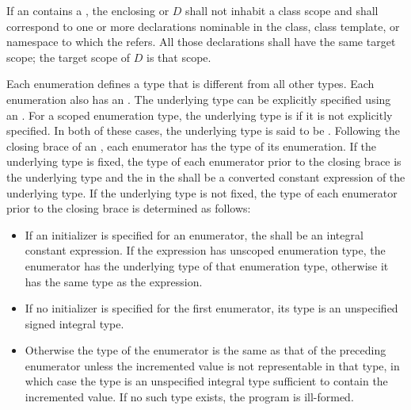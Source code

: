 \pnum
If an  contains a
,
the enclosing 
or  $D$
shall not inhabit a class scope and
shall correspond to one or more declarations nominable
in the class, class template, or namespace
to which the  refers.
All those declarations shall have the same target scope;
the target scope of $D$ is that scope.

\pnum
{}%
%
Each enumeration defines a type that is different from all other types.
Each enumeration also has an .
The underlying type can be explicitly specified using an .
For a scoped enumeration type, the underlying type is  if it is not
explicitly specified. In both of these cases, the underlying type is said to be
.
Following the closing brace of an , each
enumerator has the type of its enumeration.
If the underlying type is fixed, the type of each enumerator
prior to the closing brace is the underlying
type
and the  in the 
shall be a converted constant expression of the underlying
type.
If the underlying
type is not fixed,
the type of each enumerator prior to the closing brace is determined as
follows:

\begin{itemize}
\item If an
initializer is specified for an enumerator, the
 shall be an integral constant
expression. If the expression has
unscoped enumeration type, the enumerator has the underlying type of that
enumeration type, otherwise it has the same type as the expression.

\item If no initializer is specified for the
first enumerator, its type is an unspecified signed integral type.

\item  Otherwise
the type of the enumerator is the same as that of the
preceding enumerator unless the incremented value is not representable
in that type, in which case the type is an unspecified integral type
sufficient to contain the incremented value. If no such type exists, the program
is ill-formed.
\end{itemize}

